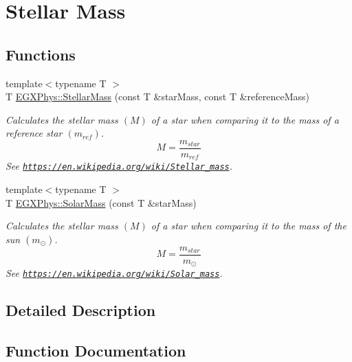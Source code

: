 \hypertarget{group___stellar_mass}{}\section{Stellar Mass}
\label{group___stellar_mass}
\subsection*{Functions}
\begin{DoxyCompactItemize}
\item 
{\footnotesize template$<$typename T $>$ }\\T \mbox{\hyperlink{group___stellar_mass_gabbd6081cd3bfb0153d7470d58f733a61}{E\+G\+X\+Phys\+::\+Stellar\+Mass}} (const T \&star\+Mass, const T \&reference\+Mass)
\begin{DoxyCompactList}\small\item\em Calculates the stellar mass $(M)$ of a star when comparing it to the mass of a reference star $(m_{ref})$. \[M=\frac{m_{star}}{m_{ref}}\] See \href{https://en.wikipedia.org/wiki/Stellar_mass}{\tt https\+://en.\+wikipedia.\+org/wiki/\+Stellar\+\_\+mass}. \end{DoxyCompactList}\item 
{\footnotesize template$<$typename T $>$ }\\T \mbox{\hyperlink{group___stellar_mass_gac393d64d586be3dc76ac7a98ac336514}{E\+G\+X\+Phys\+::\+Solar\+Mass}} (const T \&star\+Mass)
\begin{DoxyCompactList}\small\item\em Calculates the stellar mass $(M)$ of a star when comparing it to the mass of the sun $(m_\odot)$. \[M=\frac{m_{star}}{m_\odot}\] See \href{https://en.wikipedia.org/wiki/Solar_mass}{\tt https\+://en.\+wikipedia.\+org/wiki/\+Solar\+\_\+mass}. \end{DoxyCompactList}\end{DoxyCompactItemize}


\subsection{Detailed Description}


\subsection{Function Documentation}
\mbox{\label{group___stellar_mass_gac393d64d586be3dc76ac7a98ac336514}} 
